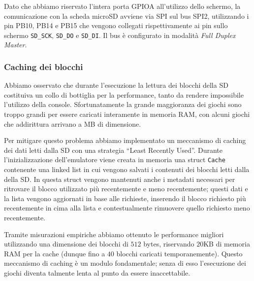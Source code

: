 \documentclass[hidelinks,12pt]{article}
\begin{document}
Dato che abbiamo riservato l'intera porta GPIOA all'utilizzo dello schermo,
la comunicazione con la scheda microSD avviene via SPI sul bus SPI2,
utilizzando i pin PB10, PB14 e PB15 che vengono collegati rispettivamente
ai pin sullo schermo \texttt{SD\_SCK}, \texttt{SD\_DO} e \texttt{SD\_DI}.
Il bus è configurato in modalità \textit{Full Duplex Master}.

\subsubsection{Caching dei blocchi}
Abbiamo osservato che durante l'esecuzione la lettura dei blocchi della SD
costituiva un collo di bottiglia per la performance, tanto da rendere
impossibile l'utilizzo della console. Sfortunatamente la grande maggioranza
dei giochi sono troppo grandi per essere caricati interamente in memoria RAM,
con alcuni giochi che addirittura arrivano a MB di dimensione.

Per mitigare questo problema abbiamo implementato un meccanismo di caching dei
dati letti dalla SD con una strategia ``Least Recently Used''.
Durante l'inizializzazione dell'emulatore viene creata in memoria una struct
\texttt{Cache} contenente una linked list in cui vengono salvati i contenuti
dei blocchi letti dalla della SD.
In questa struct vengono mantenuti anche i metadati necessari per
ritrovare il blocco utilizzato più recentemente e meno recentemente; questi dati
e la lista vengono aggiornati in base alle richieste, inserendo il blocco
richiesto più recentemente in cima alla lista e contestualmente rimuovere quello
richiesto meno recentemente.

Tramite misurazioni empiriche abbiamo ottenuto le performance migliori
utilizzando una dimensione dei blocchi di $512$ bytes, riservando $20$KB di
memoria RAM per la cache (dunque fino a $40$ blocchi caricati temporanemente).
Questo meccanismo di caching è un modulo fondamentale; senza di esso l'esecuzione
dei giochi diventa talmente lenta al punto da essere inaccettabile.

\end{document}
